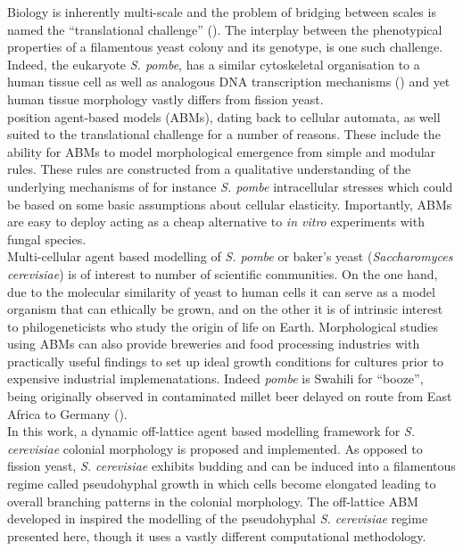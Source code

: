 Biology is inherently multi-scale and the problem 
of bridging between scales is named the ``translational challenge'' (\cite{an2009agent}).
The interplay between the phenotypical properties of a filamentous yeast colony and 
its genotype, is one such challenge. Indeed, the eukaryote \textit{S. pombe}, has a similar 
cytoskeletal organisation to a human tissue cell as well as analogous DNA transcription mechanisms 
(\cite{hoffman2015ancient}) and yet human tissue 
morphology vastly differs from fission yeast.
\\

\cite{an2009agent} position agent-based models (ABMs), dating back to cellular automata, as well suited to the 
 translational challenge for a number of reasons. These include the ability 
 for ABMs to model morphological emergence from simple and modular rules. These rules 
 are constructed from a qualitative understanding of the underlying mechanisms of for instance 
 \textit{S. pombe} intracellular stresses which could be based on some basic assumptions
 about cellular elasticity. Importantly, ABMs are easy to deploy acting 
 as a cheap alternative to \textit{in vitro} experiments with fungal species.
 \\

 Multi-cellular agent based modelling of \textit{S. pombe} or baker's yeast 
 (\textit{Saccharomyces cerevisiae}) is of interest to number of scientific  
 communities. On the one hand, due to the molecular similarity of yeast to human 
 cells it can serve as a model organism that can ethically be grown, and on 
 the other it is of intrinsic interest to philogeneticists who study the origin 
 of life on Earth. Morphological studies using ABMs can also provide breweries and 
 food processing industries with practically useful findings to 
 set up ideal growth conditions for cultures prior to expensive 
 industrial implemenatations. Indeed \textit{pombe} is Swahili 
 for ``booze'', being originally observed in contaminated 
 millet beer delayed on route from East Africa to Germany (\cite{hayles2018introduction}).
 \\

 In this work, a dynamic off-lattice agent based modelling framework for \textit{S. cerevisiae} colonial morphology 
 is proposed and implemented. As opposed to fission yeast, \textit{S. cerevisiae} exhibits 
 budding and can be induced into a filamentous regime called pseudohyphal growth
 in which cells become elongated leading to overall branching patterns 
 in the colonial morphology. The off-lattice ABM developed in \cite{li2024off} 
 inspired the modelling of the pseudohyphal \textit{S. cerevisiae} regime 
 presented here, though it uses a vastly different computational methodology.
 \\

